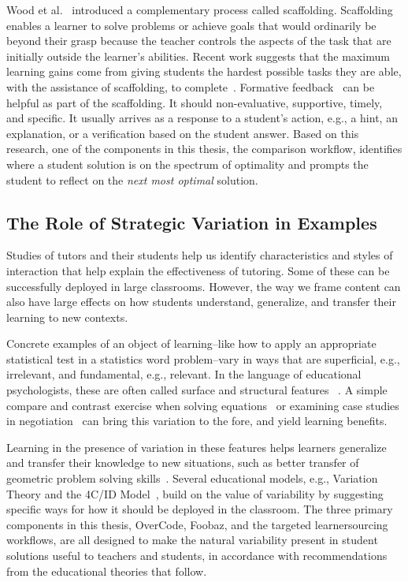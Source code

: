 Wood et al.~\cite{woodscaffolding} introduced a complementary process called scaffolding. Scaffolding enables a learner to solve problems or achieve goals that would ordinarily be beyond their grasp because the teacher controls the aspects of the task that are initially outside the learner's abilities. Recent work suggests that the maximum learning gains come from giving students the hardest possible tasks they are able, with the assistance of scaffolding, to complete~\cite{zpd14}. Formative feedback~\cite{formative} can be helpful as part of the scaffolding. It should non-evaluative, supportive, timely, and specific. It usually arrives as a response to a student's action, e.g., a hint, an explanation, or a verification based on the student answer. Based on this research, one of the components in this thesis, the comparison workflow, identifies where a student solution is on the spectrum of optimality and prompts the student to reflect on the {\it next most optimal} solution.

\subsection{The Role of Strategic Variation in Examples}

Studies of tutors and their students help us identify characteristics and styles of interaction that help explain the effectiveness of tutoring. Some of these can be successfully deployed in large classrooms. However, the way we frame content can also have large effects on how students understand, generalize, and transfer their learning to new contexts.

Concrete examples of an object of learning--like how to apply an appropriate statistical test in a statistics word problem--vary in ways that are superficial, e.g., irrelevant, and fundamental, e.g., relevant. In the language of educational psychologists, these are often called surface and structural features ~\cite{quilicimayer}. A simple compare and contrast exercise when solving equations~\cite{rittle2007does} or examining case studies in negotiation~\cite{loewenstein2003analogical} can bring this variation to the fore, and yield learning benefits.

Learning in the presence of variation in these features helps learners generalize and transfer their knowledge to new situations, such as better transfer of geometric problem solving skills~\cite{workedexamplesvariability,Variabilityofpractice}. Several educational models, e.g., Variation Theory and the 4C/ID Model~\cite{van2002blueprints}, build on the value of variability by suggesting specific ways for how it should be deployed in the classroom. The three primary components in this thesis, OverCode, Foobaz, and the targeted learnersourcing workflows, are all designed to make the natural variability present in student solutions useful to teachers and students, in accordance with recommendations from the educational theories that follow.

